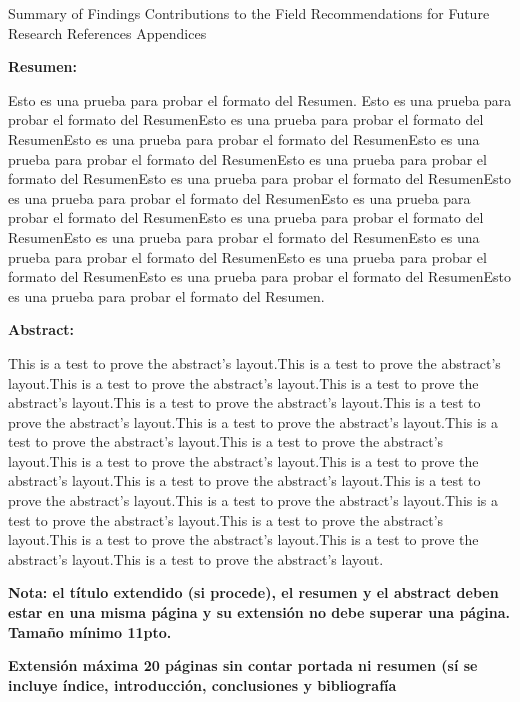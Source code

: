 \documentclass[11pt, a4paper]{article} %
\begin{document}
Summary of Findings
Contributions to the Field
Recommendations for Future Research
References
Appendices

{\bfseries \large Resumen:} \vspace{5mm}

Esto es una prueba para probar el formato del Resumen. Esto es una prueba para probar el formato del ResumenEsto es una prueba para probar el formato del ResumenEsto es una prueba para probar el formato del ResumenEsto es una prueba para probar el formato del ResumenEsto es una prueba para probar el formato del ResumenEsto es una prueba para probar el formato del ResumenEsto es una prueba para probar el formato del ResumenEsto es una prueba para probar el formato del ResumenEsto es una prueba para probar el formato del ResumenEsto es una prueba para probar el formato del ResumenEsto es una prueba para probar el formato del ResumenEsto es una prueba para probar el formato del ResumenEsto es una prueba para probar el formato del ResumenEsto es una prueba para probar el formato del Resumen.
\vspace{1cm}

{\bfseries \large Abstract: }\vspace{5mm} 

This is a test to prove the abstract's layout.This is a test to prove the abstract's layout.This is a test to prove the abstract's layout.This is a test to prove the abstract's layout.This is a test to prove the abstract's layout.This is a test to prove the abstract's layout.This is a test to prove the abstract's layout.This is a test to prove the abstract's layout.This is a test to prove the abstract's layout.This is a test to prove the abstract's layout.This is a test to prove the abstract's layout.This is a test to prove the abstract's layout.This is a test to prove the abstract's layout.This is a test to prove the abstract's layout.This is a test to prove the abstract's layout.This is a test to prove the abstract's layout.This is a test to prove the abstract's layout.This is a test to prove the abstract's layout.This is a test to prove the abstract's layout.
\vspace{1cm}

{\Large\textbf{Nota: el título extendido (si procede), el resumen y el abstract deben estar en una misma página y su extensión no debe superar una página. Tamaño mínimo 11pto.}}
\vspace{1cm}

{\Large\textbf{Extensión máxima 20 páginas sin contar portada ni resumen (sí se incluye índice, introducción, conclusiones y bibliografía}}
\newpage
\end{document}
